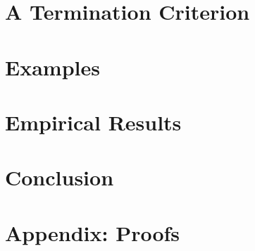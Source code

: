 
  
\section{A Termination Criterion} 
\label{antipattern:sec:termination_criterion}


\section{Examples}
\label{antipattern:sec:examples}


\section{Empirical Results}
\label{antipattern:sec:related_work} 


\section{Conclusion} 
\label{antipattern:sec:conclusion}
 

\newpage
\section{Appendix: Proofs}
\label{antipattern:sec:appendix}


      